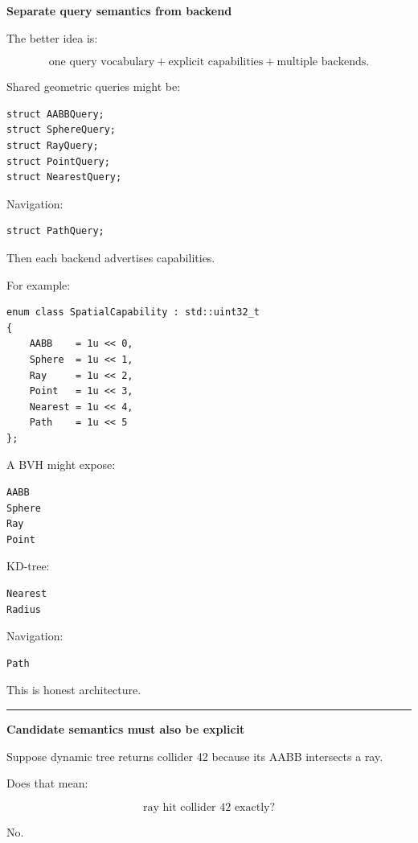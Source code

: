 \textbf{Separate query semantics from backend}

The better idea is:

\[
\boxed{
\text{one query vocabulary}
+
\text{explicit capabilities}
+
\text{multiple backends}.
}
\]

Shared geometric queries might be:

\begin{verbatim}
struct AABBQuery;
struct SphereQuery;
struct RayQuery;
struct PointQuery;
struct NearestQuery;
\end{verbatim}

Navigation:

\begin{verbatim}
struct PathQuery;
\end{verbatim}

Then each backend advertises capabilities.

For example:

\begin{verbatim}
enum class SpatialCapability : std::uint32_t
{
    AABB    = 1u << 0,
    Sphere  = 1u << 1,
    Ray     = 1u << 2,
    Point   = 1u << 3,
    Nearest = 1u << 4,
    Path    = 1u << 5
};
\end{verbatim}

A BVH might expose:

\begin{verbatim}
AABB
Sphere
Ray
Point
\end{verbatim}

KD-tree:

\begin{verbatim}
Nearest
Radius
\end{verbatim}

Navigation:

\begin{verbatim}
Path
\end{verbatim}

This is honest architecture.

\begin{center}\rule{0.5\linewidth}{0.5pt}\end{center}

\textbf{Candidate semantics must also be explicit}

Suppose dynamic tree returns collider 42 because its AABB intersects a ray.

Does that mean:

\[
\text{ray hit collider 42 exactly}?
\]

No.

